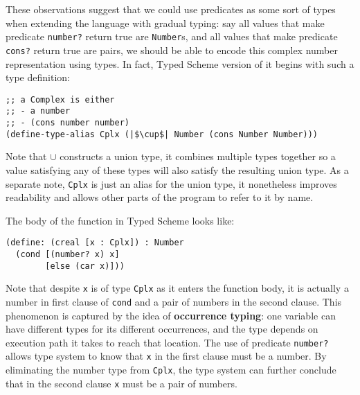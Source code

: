 These observations suggest that we could use predicates as some sort of types
when extending the language with gradual typing: say all values that make predicate \texttt{number?}
return true are \texttt{Number}s, and all values that make predicate \texttt{cons?} return true
are pairs, we should be able to encode this complex number representation using types.
In fact, Typed Scheme version of it begins with such a type definition:



\begin{verbatim}
;; a Complex is either
;; - a number
;; - (cons number number)
(define-type-alias Cplx (|$\cup$| Number (cons Number Number)))
\end{verbatim}

Note that $\cup$ constructs a union type, it combines multiple types together so
a value satisfying any of these types will also satisfy the resulting union type.
As a separate note, \texttt{Cplx} is just an alias for the union type,
it nonetheless improves readability
and allows other parts of the program to refer to it by name.

The body of the function in Typed Scheme looks like:

\begin{verbatim}
(define: (creal [x : Cplx]) : Number
  (cond [(number? x) x]
        [else (car x)]))
\end{verbatim}


Note that despite \texttt{x} is of type \texttt{Cplx} as it enters the function body,
it is actually a number in first clause of \texttt{cond} and a pair of numbers
in the second clause. This phenomenon is captured by the idea of
\textbf{occurrence typing}: one variable can have different types
for its different occurrences, and the type depends on execution path it takes to reach that location.
The use of predicate \texttt{number?} allows type system to know that \texttt{x}
in the first clause must be a number. By eliminating the number type from \texttt{Cplx},
the type system can further conclude that in the second clause \texttt{x} must be a pair of numbers.

